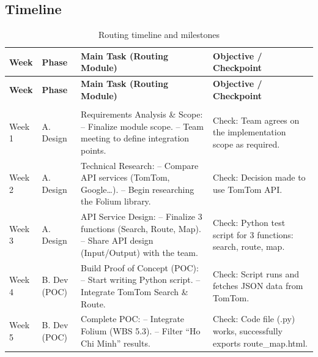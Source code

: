 \subsection{Timeline}
\renewcommand{\arraystretch}{1.15}
\begin{longtable}{|>{\raggedright\arraybackslash}p{}|>{\raggedright\arraybackslash}p{}|>{\raggedright\arraybackslash}p{}|>{\raggedright\arraybackslash}p{}|}
\caption{Routing timeline and milestones}\label{tab:routing-timeline}\\
\hline
    \textbf{Week} & \textbf{Phase} & \textbf{Main Task (Routing Module)} & \textbf{Objective / Checkpoint} \\
\hline
\endfirsthead
\hline
    \textbf{Week} & \textbf{Phase} & \textbf{Main Task (Routing Module)} & \textbf{Objective / Checkpoint} \\
\hline
\endhead
\hline
\multicolumn{4}{r}{Continued on next page} \\
\hline
\endfoot
\hline
\endlastfoot
Week 1 & A. Design & Requirements Analysis \& Scope: \newline\quad -- Finalize module scope. \newline\quad -- Team meeting to define integration points. & Check: Team agrees on the implementation scope as required. \\
\hline
Week 2 & A. Design & Technical Research: \newline\quad -- Compare API services (TomTom, Google\ldots). \newline\quad -- Begin researching the Folium library. & Check: Decision made to use TomTom API. \\
\hline
Week 3 & A. Design & API Service Design: \newline\quad -- Finalize 3 functions (Search, Route, Map). \newline\quad -- Share API design (Input/Output) with the team. & Check: Python test script for 3 functions: search, route, map. \\
\hline
Week 4 & B. Dev (POC) & Build Proof of Concept (POC): \newline\quad -- Start writing Python script. \newline\quad -- Integrate TomTom Search \& Route. & Check: Script runs and fetches JSON data from TomTom. \\
\hline
Week 5 & B. Dev (POC) & Complete POC: \newline\quad -- Integrate Folium (WBS 5.3). \newline\quad -- Filter ``Ho Chi Minh'' results. & Check: Code file (.py) works, successfully exports route\_map.html. \\

\end{longtable}
